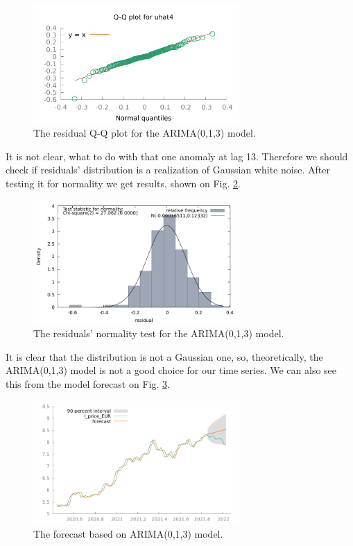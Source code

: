 \documentclass[14pt,a4paper]{extarticle}
\newcounter{e}
\numberwithin{equation}{section}
\numberwithin{figure}{section}
\begin{document}
\begin{figure}[h!]
	\centering
	\includegraphics[width=0.7\textwidth]{resources/qq_residual.pdf}
	\caption{The residual Q-Q plot for the ARIMA(0,1,3) model.}
	\label{fig:qq_residual}
\end{figure}

It is not clear, what to do with that one anomaly at lag 13. Therefore we should check if residuals' distribution is a realization of Gaussian white noise. After testing it for normality we get results, shown on Fig. \ref{fig:residuals_normality}.

\begin{figure}[h!]
	\centering
	\includegraphics[width=0.7\textwidth]{resources/residuals_normality.pdf}
	\caption{The residuals' normality test for the ARIMA(0,1,3) model.}
	\label{fig:residuals_normality}
\end{figure}

It is clear that the distribution is not a Gaussian one, so, theoretically, the ARIMA(0,1,3) model is not a good choice for our time series. We can also see this from the model forecast on Fig. \ref{fig:ma3forecast}. 

\begin{figure}[h!]
	\centering
	\includegraphics[width=0.7\textwidth]{resources/ma3forecast.pdf}
	\caption{The forecast based on ARIMA(0,1,3) model.}
	\label{fig:ma3forecast}
\end{figure}
\end{document}
